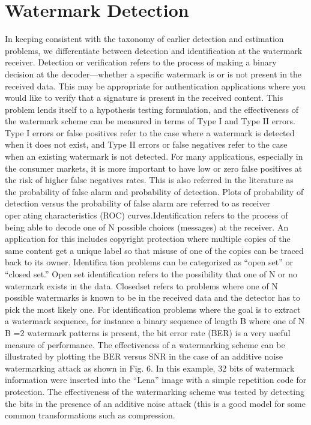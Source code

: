 \documentclass[12pt]{IEeetran}
\begin{document}
\section{Watermark Detection}
In keeping consistent with the taxonomy of earlier detection and estimation problems, we differentiate between
detection and identification at the watermark receiver.
Detection or verification refers to the process of making a
binary decision at the decoder—whether a specific watermark is or is not present in the received data. This may be
appropriate for authentication applications where you
would like to verify that a signature is present in the received content. This problem lends itself to a hypothesis
testing formulation, and the effectiveness of the watermark scheme can be measured in terms of Type I and Type
II errors. Type I errors or false positives refer to the case
where a watermark is detected when it does not exist, and
Type II errors or false negatives refer to the case when an
existing watermark is not detected. For many applications, especially in the consumer markets, it is more important to have low or zero false positives at the risk of
higher false negatives rates. This is also referred in the literature as the probability of false alarm and probability of
detection. Plots of probability of detection versus the
probability of false alarm are referred to as receiver oper￾ating characteristics (ROC) curves.Identification refers to
the process of being able to decode one of N possible
choices (messages) at the receiver. An application for this
includes copyright protection where multiple copies of
the same content get a unique label so that misuse of one
of the copies can be traced back to its owner. Identifica￾tion problems can be categorized as “open set” or “closed
set.” Open set identification refers to the possibility that
one of N or no watermark exists in the data. Closedset refers to problems where one of N possible watermarks is
known to be in the received data and the detector has to
pick the most likely one. For identification problems
where the goal is to extract a watermark sequence, for instance a binary sequence of length B where one of N B =2
watermark patterns is present, the bit error rate (BER) is
a very useful measure of performance. The effectiveness
of a watermarking scheme can be illustrated by plotting
the BER versus SNR in the case of an additive noise
watermarking attack as shown in Fig. 6. In this example,
32 bits of watermark information were inserted into the
“Lena” image with a simple repetition code for protection. The effectiveness of the watermarking scheme was
tested by detecting the bits in the presence of an additive
noise attack (this is a good model for some common
transformations such as compression.
\end{document}

